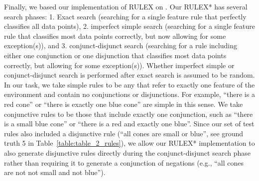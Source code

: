 \documentclass[doc,natbib,floatsintext]{apa7}
\begin{document}
Finally, we based our implementation of RULEX on \cite{navarro2005analyzing}. Our RULEX* has several search phases: 1. Exact search (searching for a single feature rule that perfectly classifies all data points), 2. imperfect simple search (searching for a single feature rule that classifies most data points correctly, but now allowing for some exception(s)), and 3. conjunct-disjunct search (searching for a rule including either one conjunction or one disjunction that classifies most data points correctly, but allowing for some exception(s)). Whether imperfect simple or conjunct-disjunct search is performed after exact search is assumed to be random. In our task, we take simple rules to be any that refer to exactly one feature of the environment and contain no conjunctions or disjunctions. For example, ``there is a red cone'' or ``there is exactly one blue cone'' are simple in this sense. We take conjunctive rules to be those that include exactly one conjunction, such as ``there is a small blue cone'' or ``there is a red and exactly one blue''. Since our set of test rules also included a disjunctive rule (``all cones are small or blue'', see ground truth 5 in Table~\ref{table:table_2_rules}), we allow our RULEX* implementation to also generate disjunctive rules directly during the conjunct-disjunct search phase rather than requiring it to generate a conjunction of negations (e.g., ``all cones are not not small and not blue'').
\end{document}
